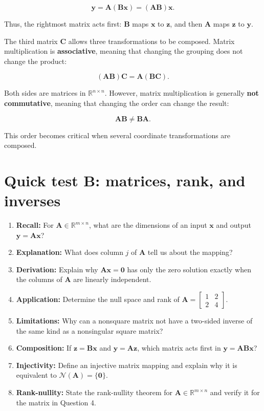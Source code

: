 \documentclass[
  australian,
  12pt,
  letterpaper,
  DIV=11,
  numbers=noendperiod,
  twoside]{scrreprt}
\providecommand{\tightlist}{%
  \setlength{\itemsep}{0pt}\setlength{\parskip}{0pt}}
\begin{document}
\[
\mathbf y
=\mathbf A(\mathbf B\mathbf x)
=(\mathbf A\mathbf B)\mathbf x.
\]

Thus, the rightmost matrix acts first: \(\mathbf B\) maps \(\mathbf x\)
to \(\mathbf z\), and then \(\mathbf A\) maps \(\mathbf z\) to
\(\mathbf y\).

The third matrix \(\mathbf C\) allows three transformations to be
composed. Matrix multiplication is \textbf{associative}, meaning that
changing the grouping does not change the product:

\[
(\mathbf A\mathbf B)\mathbf C
=
\mathbf A(\mathbf B\mathbf C).
\]

Both sides are matrices in \(\mathbb R^{n\times n}\). However, matrix
multiplication is generally \textbf{not commutative}, meaning that
changing the order can change the result:

\[
\mathbf A\mathbf B\neq\mathbf B\mathbf A.
\]

This order becomes critical when several coordinate transformations are
composed.

\section*{Quick test B: matrices, rank, and
inverses}\label{quick-test-b-matrices-rank-and-inverses}


\begin{enumerate}
\def\labelenumi{\arabic{enumi}.}
\tightlist
\item
  \textbf{Recall:} For \(\mathbf A\in\mathbb R^{m\times n}\), what are
  the dimensions of an input \(\mathbf x\) and output
  \(\mathbf y=\mathbf A\mathbf x\)?
\item
  \textbf{Explanation:} What does column \(j\) of \(\mathbf A\) tell us
  about the mapping?
\item
  \textbf{Derivation:} Explain why \(\mathbf A\mathbf x=\mathbf 0\) has
  only the zero solution exactly when the columns of \(\mathbf A\) are
  linearly independent.
\item
  \textbf{Application:} Determine the null space and rank of
  \(\mathbf A=\begin{bmatrix}1&2\\2&4\end{bmatrix}\).
\item
  \textbf{Limitations:} Why can a nonsquare matrix not have a two-sided
  inverse of the same kind as a nonsingular square matrix?
\item
  \textbf{Composition:} If \(\mathbf z=\mathbf B\mathbf x\) and
  \(\mathbf y=\mathbf A\mathbf z\), which matrix acts first in
  \(\mathbf y=\mathbf A\mathbf B\mathbf x\)?
\item
  \textbf{Injectivity:} Define an injective matrix mapping and explain
  why it is equivalent to \(\mathcal N(\mathbf A)=\{\mathbf0\}\).
\item
  \textbf{Rank-nullity:} State the rank-nullity theorem for
  \(\mathbf A\in\mathbb R^{m\times n}\) and verify it for the matrix in
  Question 4.
\end{enumerate}
\end{document}
